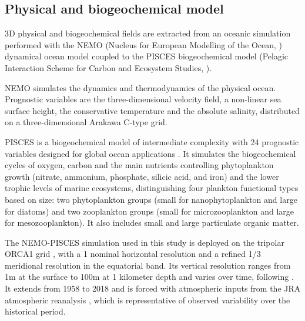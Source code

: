 \subsection{Physical and biogeochemical model}
\label{sec:nemo}

3D physical and biogeochemical fields are extracted from an oceanic simulation performed with the NEMO (Nucleus for European Modelling of the Ocean, \citealp{madecNEMOOceanEngine2019}) dynamical ocean model coupled to the PISCES biogeochemical model (Pelagic Interaction Scheme for Carbon and Ecosystem Studies, \citealp{aumontPISCESv2OceanBiogeochemical2015}). 

NEMO simulates the dynamics and thermodynamics of the physical ocean. Prognostic variables are
the three-dimensional velocity field, a non-linear sea surface height, the
conservative temperature and the absolute salinity, distributed on a three-dimensional Arakawa C-type grid.

PISCES is a biogeochemical model of intermediate complexity with 24 prognostic variables designed for global ocean applications \citep{aumontPISCESv2OceanBiogeochemical2015}. It simulates the biogeochemical cycles of oxygen, carbon and the main nutrients controlling phytoplankton growth (nitrate, ammonium, phosphate, silicic acid, and iron) and the lower trophic levels of marine ecosystems, distinguishing four plankton functional types based on size: two phytoplankton groups (small for nanophytoplankton and large for diatoms) and two zooplankton groups (small for microzooplankton and large for mesozooplankton). It also includes small and large particulate organic matter.

The NEMO-PISCES simulation used in this study is deployed on the tripolar ORCA1 grid \citep{madecGlobalOceanMesh1996}, with a 1\degree{} nominal horizontal resolution and a refined 1/3\degree{} meridional resolution in the equatorial band. Its vertical resolution ranges from 1m at the surface to 100m at 1 kilometer depth and varies over time, following \cite{levierFreeSurfaceVariable2007}. It extends from 1958 to 2018 and is forced with atmospheric inputs from the JRA atmospheric reanalysis \citep{kobayashiJRA55ReanalysisGeneral2015}, which is representative of observed variability over the historical period. 

